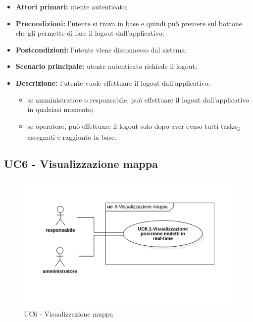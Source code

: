 \begin{itemize}
	\item 	\textbf{Attori primari:} utente autenticato;
	\item 	\textbf{Precondizioni:} l'utente si trova in base e quindi può premere sul bottone che gli permette di fare il logout dall'applicativo;
	\item 	\textbf{Postcondizioni:} l'utente viene disconnesso dal sistema;
	\item 	\textbf{Scenario principale:} utente autenticato richiede il logout;
	\item 	\textbf{Descrizione:} l'utente vuole effettuare il logout dall'applicativo:
	\begin{itemize}
		\item se amministratore o responsabile, può effettuare il logout dall'applicativo in qualsiasi momento;
		\item se operatore, può effettuare il logout solo dopo aver evaso tutti \glspl{task}\textsubscript{G} assegnati e raggiunto la base.
	\end{itemize}
\end{itemize}


\subsection{UC6 - Visualizzazione mappa}

\begin{figure}[H]
	\centering
	\includegraphics[scale=0.52]{res/images/uc6.png}
	\caption{UC6 - Visualizzazione mappa}
\end{figure}

